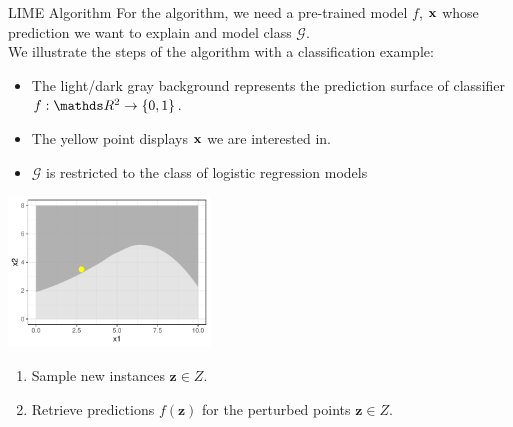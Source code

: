 \documentclass[11pt,compress,t,notes=noshow, xcolor=table]{beamer}
\newcommand{\Gspace}{\mathcal{G}}
\newcommand{\zv}{\mathbf{z}}
\begin{document}
\begin{vbframe}{LIME Algorithm}
		For the algorithm, we need a pre-trained model $f$, $\xv$ whose prediction we want to explain and model class $\Gspace$.\\ \vspace{0.5cm}
		We illustrate the steps of the algorithm with a classification example: 
		\begin{itemize}
			\item The light/dark gray background represents the prediction surface of classifier $f: \R^2 \to \{0, 1\}$.
			\item The yellow point displays $\xv$ we are interested in. 
			\item $\Gspace$ is restricted to the class of logistic regression models 
		\end{itemize}
		\begin{center}
			\includegraphics[width=0.4\textwidth]{figure/lime2}
		\end{center}
	
		\begin{enumerate}
		\framebreak 
		\item Sample new instances $\zv \in Z$. 
		\item Retrieve predictions $f(\zv)$ for the perturbed points $\zv \in Z$. \\[0.2cm]
		

\end{enumerate}
\end{vbframe}
\end{document}
